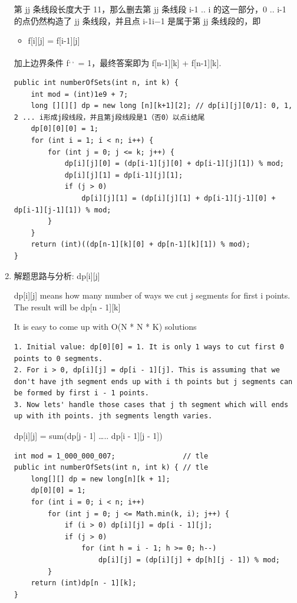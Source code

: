 \documentclass[9pt, b5paaper]{book}
\begin{document}
\begin{enumerate}
第 jj 条线段长度大于 11，那么删去第 jj 条线段 i-1 .. i 的这一部分，0 .. i-1 的点仍然构造了 jj 条线段，并且点 i-1i−1 是属于第 jj 条线段的，即

\begin{itemize}
\item f[i][j]\footnotemark[2]{} = f[i-1][j]\footnotemark[2]{}
\end{itemize}

加上边界条件 f\footnotemark[1]{}\textsuperscript{,}\,\footnotemark[1]{}\textsuperscript{,}\,\footnotemark[1]{} = 1，最终答案即为 f[n-1][k]\footnotemark[1]{} + f[n-1][k]\footnotemark[2]{}.

\begin{verbatim}
public int numberOfSets(int n, int k) {
    int mod = (int)1e9 + 7;
    long [][][] dp = new long [n][k+1][2]; // dp[i][j][0/1]: 0, 1, 2 ... i形成j段线段，并且第j段线段是1（否0）以点i结尾
    dp[0][0][0] = 1;
    for (int i = 1; i < n; i++) {
        for (int j = 0; j <= k; j++) {
            dp[i][j][0] = (dp[i-1][j][0] + dp[i-1][j][1]) % mod;
            dp[i][j][1] = dp[i-1][j][1];
            if (j > 0)
                dp[i][j][1] = (dp[i][j][1] + dp[i-1][j-1][0] + dp[i-1][j-1][1]) % mod; 
        }
    }
    return (int)((dp[n-1][k][0] + dp[n-1][k][1]) % mod);
}
\end{verbatim}
\item 解题思路与分析: dp[i][j]
\label{sec-1-5-5-3}

dp[i][j] means how many number of ways we cut j segments for first i points. The result will be dp[n - 1][k]

It is easy to come up with O(N * N * K) solutions
\begin{verbatim}
1. Initial value: dp[0][0] = 1. It is only 1 ways to cut first 0 points to 0 segments.
2. For i > 0, dp[i][j] = dp[i - 1][j]. This is assuming that we don't have jth segment ends up with i th points but j segments can be formed by first i - 1 points.
3. Now lets' handle those cases that j th segment which will ends up with ith points. jth segments length varies.
\end{verbatim}

dp[i][j] = sum(dp\footnotemark[1]{}[j - 1] \ldots{}.. dp[i - 1][j - 1])

\begin{verbatim}
int mod = 1_000_000_007;                // tle
public int numberOfSets(int n, int k) { // tle
    long[][] dp = new long[n][k + 1];
    dp[0][0] = 1;
    for (int i = 0; i < n; i++) 
        for (int j = 0; j <= Math.min(k, i); j++) {
            if (i > 0) dp[i][j] = dp[i - 1][j];
            if (j > 0) 
                for (int h = i - 1; h >= 0; h--) 
                    dp[i][j] = (dp[i][j] + dp[h][j - 1]) % mod;
        }
    return (int)dp[n - 1][k];
}
\end{verbatim}


\end{enumerate}
\end{document}
